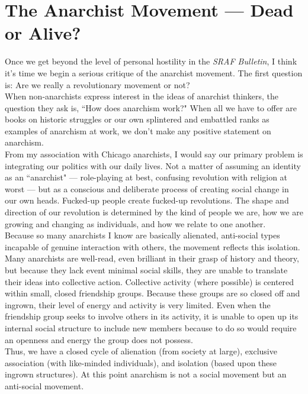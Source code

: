 \chapter{The Anarchist Movement --- Dead or Alive?}

Once we get beyond the level of personal hostility in the \emph{SRAF Bulletin}, I think it's time we begin a serious critique of the anarchist movement. The first question is: Are we really a revolutionary movement or not?\\
When non-anarchists express interest in the ideas of anarchist thinkers, the question they ask is, ``How does anarchism work?" When all we have to offer are books on historic struggles or our own splintered and embattled ranks as examples of anarchism at work, we don't make any positive statement on anarchism.\\
From my association with Chicago anarchists, I would say our primary problem is integrating our politics with our daily lives. Not a matter of assuming an identity as an ``anarchist" --- role-playing at best, confusing revolution with religion at worst --- but as a conscious and deliberate process of creating social change in our own heads. Fucked-up people create fucked-up revolutions. The shape and direction of our revolution is determined by the kind of people we are, how we are growing and changing as individuals, and how we relate to one another.\\
Because so many anarchists I know are basically alienated, anti-social types incapable of genuine interaction with others, the movement reflects this isolation. Many anarchists are well-read, even brilliant in their grasp of history and theory, but because they lack event minimal social skills, they are unable to translate their ideas into collective action. Collective activity (where possible) is centered within small, closed friendship groups. Because these groups are so closed off and ingrown, their level of energy and activity is very limited. Even when the friendship group seeks to involve others in its activity, it is unable to open up its internal social structure to include new members because to do so would require an openness and energy the group does not possess.\\
Thus, we have a closed cycle of alienation (from society at large), exclusive association (with like-minded individuals), and isolation (based upon these ingrown structures). At this point anarchism is not a social movement but an anti-social movement.\\
